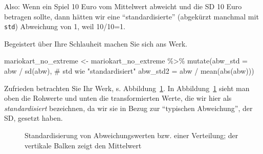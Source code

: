 \documentclass[
  letterpaper,
]{scrbook}
\newenvironment{Shaded}{\begin{snugshade}}{\end{snugshade}}
\newcommand{\AttributeTok}[1]{\textcolor[rgb]{0.40,0.45,0.13}{#1}}
\newcommand{\CommentTok}[1]{\textcolor[rgb]{0.37,0.37,0.37}{#1}}
\newcommand{\FunctionTok}[1]{\textcolor[rgb]{0.28,0.35,0.67}{#1}}
\newcommand{\NormalTok}[1]{\textcolor[rgb]{0.00,0.23,0.31}{#1}}
\newcommand{\OtherTok}[1]{\textcolor[rgb]{0.00,0.23,0.31}{#1}}
\newcommand{\SpecialCharTok}[1]{\textcolor[rgb]{0.37,0.37,0.37}{#1}}
\theoremstyle{definition}
\theoremstyle{definition}
\theoremstyle{definition}
\theoremstyle{remark}
\begin{document}
Also: Wenn ein Spiel 10 Euro vom Mittelwert abweicht und die SD 10 Euro
betragen sollte, dann hätten wir eine \enquote{standardisierte}
(abgekürzt manchmal mit \texttt{std}) Abweichung von 1, weil 10/10=1.

Begeistert über Ihre Schlauheit machen Sie sich ans Werk.

\begin{Shaded}
\begin{Highlighting}[]
\NormalTok{mariokart\_no\_extreme }\OtherTok{\textless{}{-}}
\NormalTok{  mariokart\_no\_extreme }\SpecialCharTok{\%\textgreater{}\%} 
  \FunctionTok{mutate}\NormalTok{(}\AttributeTok{abw\_std =}\NormalTok{ abw }\SpecialCharTok{/} \FunctionTok{sd}\NormalTok{(abw),  }\CommentTok{\# std wie "standardisiert"}
         \AttributeTok{abw\_std2 =}\NormalTok{ abw }\SpecialCharTok{/} \FunctionTok{mean}\NormalTok{(}\FunctionTok{abs}\NormalTok{(abw)))  }
\end{Highlighting}
\end{Shaded}

Zufrieden betrachten Sie Ihr Werk, s. Abbildung~\ref{fig-z-transf}. In
Abbildung~\ref{fig-z-transf} sieht man oben die Rohwerte und unten die
transformierten Werte, die wir hier als \emph{standardisiert}
bezeichnen, da wir sie in Bezug zur \enquote{typischen Abweichung}, der
SD, gesetzt haben.

\begin{figure}


\caption{\label{fig-z-transf}Standardisierung von Abweichungswerten bzw.
einer Verteilung; der vertikale Balken zeigt den Mittelwert}

\end{figure}%
\end{document}
